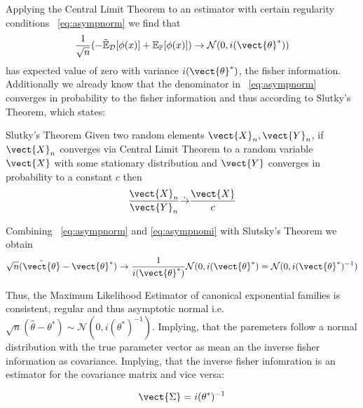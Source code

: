       Applying the Central Limit Theorem to an estimator with certain regularity conditions \eq~\ref{eq:asympnorm} 
      we find that 
        \begin{equation}
            \label{eq:asympnomi}
            \frac{1}{\sqrt{n}} ( -\tilde{\mathbb{E}}_{\mathcal{D}}[\phi(x)] + \mathbb{E}_{\mathbb{P}}[\phi(x)]) \rightarrow \mathcal{N}(0, i(\vect{\theta}^*))
        \end{equation}
        has expected value of zero with variance $i(\vect{\theta}^*)$, the fisher information.
        Additionally we already know that the denominator in \eq~\ref{eq:asympnorm} converges in probability to the fisher information and thus according to Slutky's Theorem, which states:

        \begin{threm}{Slutky's Theorem \cite{casella2002statistical}}
            Given two random elements $\vect{X}_n, \vect{Y}_n$, if $\vect{X}_n$ converges via Central Limit Theorem to a random variable $\vect{X}$ with some stationary distribution and $\vect{Y}$ converges in probability to a constant $c$ then 
            \begin{equation}
                \frac{\vect{X}_n}{\vect{Y}_n} \dot{\rightarrow} \frac{\vect{X}}{c}
            \end{equation}
        \end{threm}

        Combining \eq~\ref{eq:asympnorm} and \ref{eq:asympnomi} with Slutsky's Theorem we obtain 
        \begin{equation}
            \sqrt{n}(\hat{\vect{\theta}} - \vect{\theta}^*)  \rightarrow \frac{1}{ i(\vect{\theta}^*)} \mathcal{N}(0, i(\vect{\theta}^*) = \mathcal{N}(0, i(\vect{\theta}^*)^{-1}) 
        \end{equation}

        Thus, the Maximum Likelihood Estimator of canonical exponential families is consistent, regular and thus asymptotic normal i.e. $\sqrt{n}(\hat{\theta} - \theta^*) \sim \mathcal{N}(0, i(\theta^*)^{-1})$.
        Implying, that the paremeters follow a normal distribution with the  true parameter vector as mean an the inverse fisher information as covariance.
        Implying, that the inverse fisher infomration is an estimator for the covariance matrix and vice versa:
        
        \begin{equation}
            \vect{\Sigma} =  i(\theta^*)^{-1}
        \end{equation}

